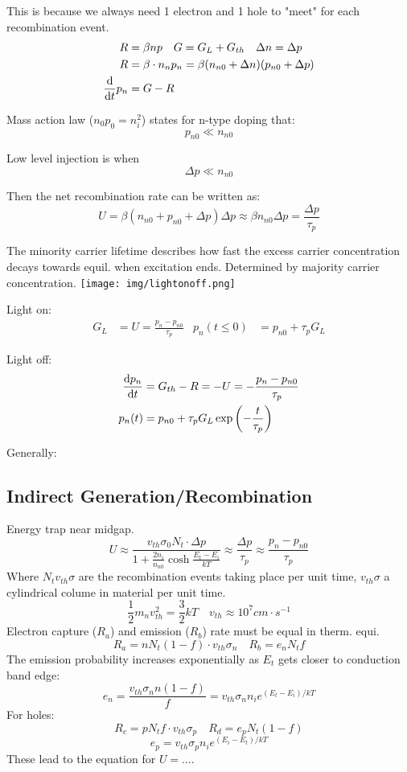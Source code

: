 \documentclass[a4paper, fontsize=8pt, landscape, DIV=1]{scrartcl}
\begin{document}
\begin{multicols*}{4}
    This is because we always need 1 electron and 1 hole to "meet" for each recombination event.
    \begin{align*}
      R &= \beta n p \quad G = G_L + G_{th} \quad \Delta n = \Delta p\\
      R &= \beta\cdot n_n p_n = \beta(n_{n0}+\Delta n)(p_{n0} + \Delta p)  \\
      \frac{\mathrm{d}}{\mathrm{d}t}p_n &= G-R
    \end{align*}

    Mass action law ($n_0p_0=n_i^2$) states for n-type doping that:
    \[p_{n0} \ll n_{n0}\]

    Low level injection is when
    \[\Delta p \ll n_{n0}\]

    Then the net recombination rate can be written as:
    \[U = \beta(n_{n0}+p_{n0}+\Delta p)\Delta p \approx \beta n_{n0}\Delta p = \frac{\Delta p}{\tau_p}\]

    The minority carrier lifetime describes how fast the excess carrier concentration decays towards equil. when excitation ends. 
    Determined by majority carrier concentration.
    \texttt{[image: img/lightonoff.png]}

    Light on:
    \begin{align*}
      G_L &= U = \frac{p_n-p_{n0}}{\tau_p} & p_n(t \leq 0) &= p_{n0} + \tau_pG_L
    \end{align*}

    Light off:
    \begin{align*}
      \frac{\mathrm{d}p_n}{\mathrm{d}t} &= G_{th} - R = -U = -\frac{p_n-p_{n0}}{\tau_p} \\
      p_n(t) &= p_{n0} + \tau_p G_L \exp\left(-\frac{t}{\tau_p}\right)
    \end{align*}

    Generally:

  \subsection{Indirect Generation/Recombination}
    Energy trap near midgap.
    \[ U \approx  \frac{v_{th}\sigma_0N_t\cdot\Delta p}{1 + \frac{2n_i}{n_{n0}}\cosh\frac{E_t - E_i}{kT}} \approx \frac{\Delta p}{\tau_p} \approx \frac{p_n - p_{n0}}{\tau_p}\]
    Where $N_tv_{th}\sigma$ are the recombination events taking place per unit time, $v_{th}\sigma$ a cylindrical colume in material per unit time.
    \[\frac{1}{2}m_nv_{th}^2=\frac{3}{2}kT \quad v_{th}\approx 10^7 cm\cdot s^{-1}\]
    Electron capture ($R_a$) and emission ($R_b$) rate must be equal in therm. equi.
    \[R_a = nN_t(1-f)\cdot v_{th}\sigma_n \quad R_b = e_nN_tf\]
    The emission probability increases exponentially as $E_t$ gets closer to conduction band edge:
    \[e_n = \frac{v_{th}\sigma_nn(1-f)}{f}=v_{th}\sigma_nn_ie^{(E_t-E_i)/kT}\]
    For holes:
    \[R_c = pN_tf\cdot v_{th}\sigma_p \quad R_d = e_pN_t(1-f)\]
    \[e_p = v_{th}\sigma_p n_i e^{(E_i-E_t)/kT}\]
    These lead to the equation for $U=\dots$.


\end{multicols*}
\end{document}
